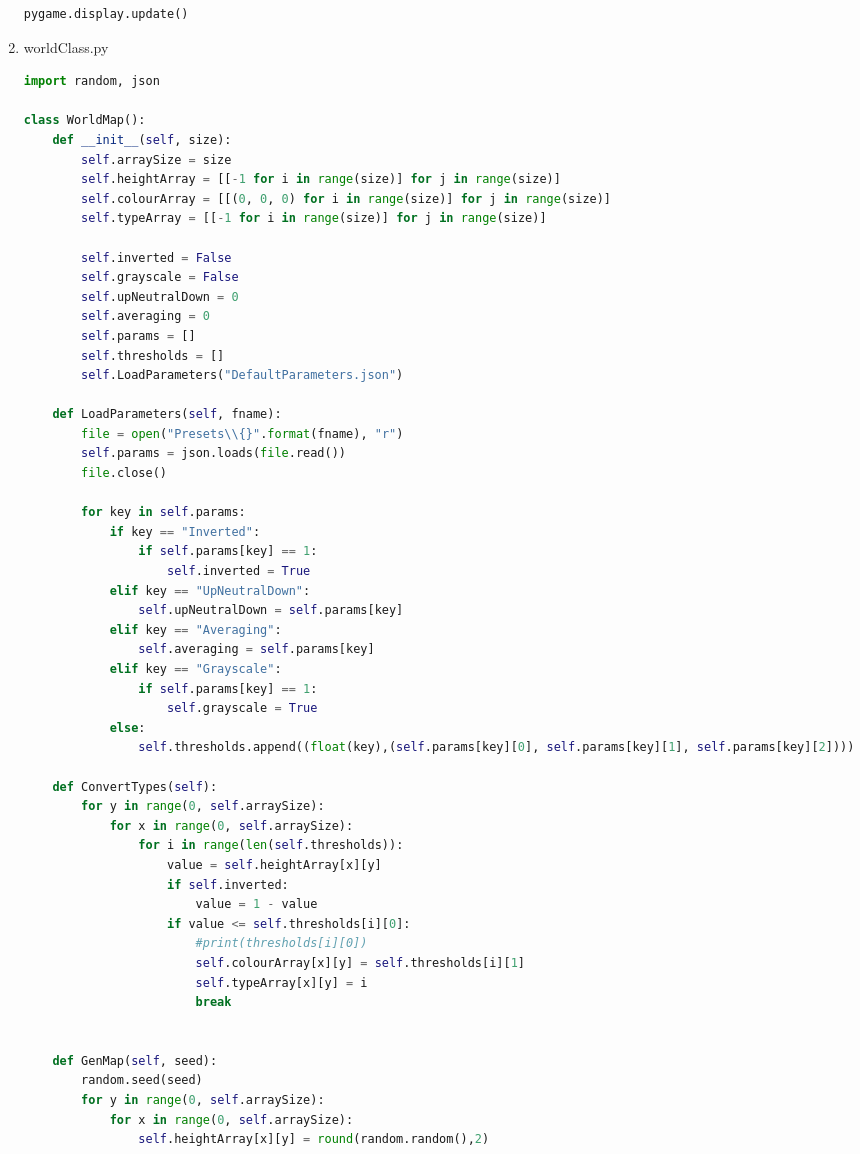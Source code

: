 \begin{flushleft}
\begin{enumerate}
\begin{lstlisting}[language=Python]
    pygame.display.update()
        \end{lstlisting}

    \item worldClass.py
        \begin{lstlisting}[language=Python]
import random, json

class WorldMap():
    def __init__(self, size):
        self.arraySize = size
        self.heightArray = [[-1 for i in range(size)] for j in range(size)]
        self.colourArray = [[(0, 0, 0) for i in range(size)] for j in range(size)]
        self.typeArray = [[-1 for i in range(size)] for j in range(size)]

        self.inverted = False
        self.grayscale = False
        self.upNeutralDown = 0
        self.averaging = 0
        self.params = []
        self.thresholds = []
        self.LoadParameters("DefaultParameters.json")

    def LoadParameters(self, fname):
        file = open("Presets\\{}".format(fname), "r")
        self.params = json.loads(file.read())
        file.close()
        
        for key in self.params:
            if key == "Inverted":
                if self.params[key] == 1:
                    self.inverted = True
            elif key == "UpNeutralDown":
                self.upNeutralDown = self.params[key]
            elif key == "Averaging":
                self.averaging = self.params[key]
            elif key == "Grayscale":
                if self.params[key] == 1:
                    self.grayscale = True
            else:
                self.thresholds.append((float(key),(self.params[key][0], self.params[key][1], self.params[key][2])))

    def ConvertTypes(self):
        for y in range(0, self.arraySize):
            for x in range(0, self.arraySize):
                for i in range(len(self.thresholds)):
                    value = self.heightArray[x][y]
                    if self.inverted:
                        value = 1 - value
                    if value <= self.thresholds[i][0]:
                        #print(thresholds[i][0])
                        self.colourArray[x][y] = self.thresholds[i][1]
                        self.typeArray[x][y] = i
                        break
            

    def GenMap(self, seed):
        random.seed(seed)
        for y in range(0, self.arraySize):
            for x in range(0, self.arraySize):
                self.heightArray[x][y] = round(random.random(),2)


\end{lstlisting}
\end{enumerate}
\end{flushleft}
